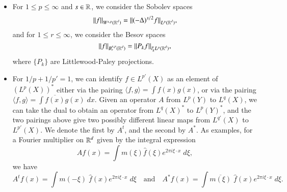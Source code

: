 \begin{itemize}
    \item For $1 \leq p \leq \infty$ and $s \in \operatorname{\mathbb{R}}$, we consider the Sobolev spaces
    \[ \| f \|_{W^{s,p}(\operatorname{\mathbb{R}}^d)} = \| (-\Delta)^{s/2} f \|_{L^p(\operatorname{\mathbb{R}}^d)}, \]
    and for $1 \leq r \leq \infty$, we consider the Besov spaces
    \[ \| f \|_{B^{s,p}_r(\operatorname{\mathbb{R}}^d)} = \| P_k f \|_{l^r_k L^p(\operatorname{\mathbb{R}}^d)}, \]
    where $\{ P_k \}$ are Littlewood-Paley projections.

    \item For $1/p + 1/p' = 1$, we can identify $f \in L^{p'}(X)$ as an element of $(L^p(X))^*$ either via the pairing $\langle f, g \rangle = \int f(x) g(x)$, or via the pairing $\langle f,g \rangle = \int \overline{f(x)} g(x)\; dx$. Given an operator $A$ from $L^p(Y)$ to $L^q(X)$, we can take the dual to obtain an operator from $L^q(X)^*$ to $L^p(Y)^*$, and the two pairings above give two possibly different linear maps from $L^{q'}(X)$ to $L^{p'}(X)$. We denote the first by $A^t$, and the second by $A^*$. As examples, for a Fourier multiplier on $\operatorname{\mathbb{R}}^d$ given by the integral expression
    \[ Af(x) = \int m(\xi) \widehat{f}(\xi) e^{2 \pi i \xi \cdot x}\; d\xi, \]
    we have
    \[ A^t f(x) = \int m(-\xi)\; \widehat{f}(x) e^{2 \pi i \xi \cdot x}\; d\xi \quad\text{and}\quad A^* f(x) = \int \overline{m(\xi)}\; \widehat{f}(x) e^{2 \pi i \xi \cdot x}\; d\xi. \]
\end{itemize}